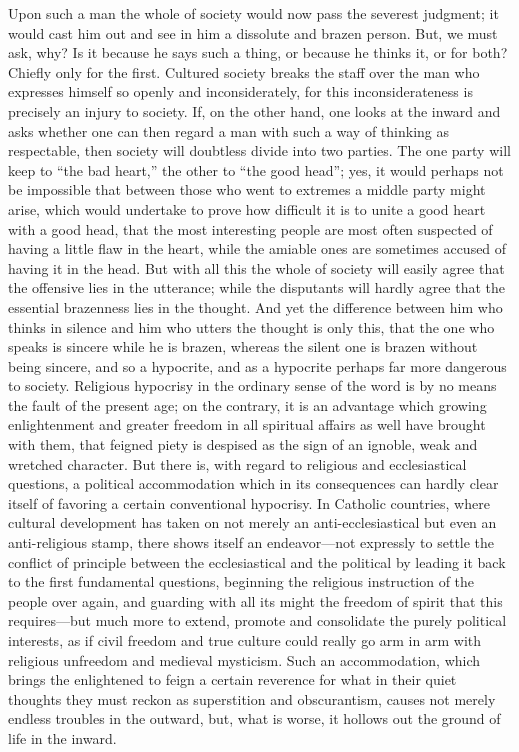 \documentclass[12pt]{book}
\newcommand{\opage}[1]{\marginnote{\footnotesize\textit{[#1]}}}
\begin{document}
Upon such a man the whole of society would now pass the severest
judgment; it would cast him out and see in him a dissolute and brazen
person. But, we must ask, why? Is it because he says such a thing, or
because he thinks it, or for both? Chiefly only for the first. Cultured
society breaks the staff over the man who expresses himself so openly and
inconsiderately, for this inconsiderateness is precisely an injury to
society. If, on the other hand, one looks at the inward and asks whether
one can then regard a man with such a way of thinking as respectable,
then society will doubtless divide into two parties. The one party will
keep to ``the bad heart,'' the other to ``the good head''; yes, it would
perhaps not be impossible that between those who went to extremes a
middle party might arise, which would undertake to prove how difficult
it is to unite a good heart with a good head, that the most interesting
people are most often suspected of having a little
\opage{107}\setcounter{footnote}{0}%
flaw in the heart, while the amiable ones are sometimes accused of having
it in the head. But with all this the whole of society will easily
agree that the offensive lies in the utterance; while the disputants
will hardly agree that the essential brazenness lies in the thought. And
yet the difference between him who thinks in silence and him who utters
the thought is only this, that the one who speaks is sincere while he is
brazen, whereas the silent one is brazen without being sincere, and so a
hypocrite, and as a hypocrite perhaps far more dangerous to society.
Religious hypocrisy in the ordinary sense of the word is by no means the
fault of the present age; on the contrary, it is an advantage which
growing enlightenment and greater freedom in all spiritual affairs as
well have brought with them, that feigned piety is despised as the sign
of an ignoble, weak and wretched character. But there is, with regard to
religious and ecclesiastical questions, a political accommodation which
in its consequences can hardly clear itself of favoring a certain
conventional hypocrisy. In Catholic countries, where cultural
development has taken on not merely an anti-ecclesiastical but even an
anti-religious stamp, there shows itself an endeavor---not expressly to
settle the conflict of principle between the ecclesiastical and the
political by leading it back to the first fundamental questions,
beginning the religious instruction of the people over again, and
guarding with all its might the freedom of spirit that this requires---but
much more to extend, promote and consolidate the purely political
interests, as if civil freedom and true culture could really go arm in
arm with religious unfreedom and medieval mysticism. Such an
accommodation, which brings the enlightened to feign a certain reverence
for what in their quiet thoughts they must reckon as superstition and
obscurantism, causes not merely endless troubles
\opage{108}\setcounter{footnote}{0}%
in the outward, but, what is worse, it hollows out the ground of life in
the inward.
\end{document}
